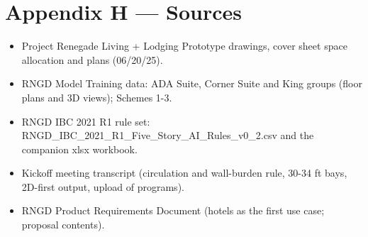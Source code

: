 \documentclass[10pt]{article}
\begin{document}
\section*{Appendix H --- Sources}
\begin{itemize}
\item Project Renegade Living + Lodging Prototype drawings, cover sheet space allocation and plans (06/20/25).
\item RNGD Model Training data: ADA Suite, Corner Suite and King groups (floor plans and 3D views); Schemes 1-3.
\item RNGD IBC 2021 R1 rule set: RNGD\_IBC\_2021\_R1\_Five\_Story\_AI\_Rules\_v0\_2.csv and the companion xlsx workbook.
\item Kickoff meeting transcript (circulation and wall-burden rule, 30-34 ft bays, 2D-first output, upload of programs).
\item RNGD Product Requirements Document (hotels as the first use case; proposal contents).
\end{itemize}
\end{document}
